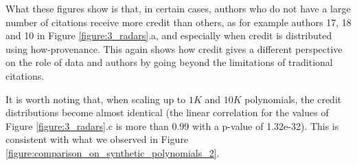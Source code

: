 \documentclass[preprint,12pt,sort&compress]{elsarticle}
\newcommand{\eat}[1]{}
\begin{document}
What these figures show is that, in certain cases, authors who do not have a large number of citations receive more credit than others, as for example authors 17, 18 and 10 in Figure \ref{figure:3_radars}.a, 
and especially when credit is distributed using how-provenance.
This again shows how credit gives a different perspective on the role of data and authors by going beyond the limitations of traditional citations.  

It is worth noting that, when scaling up to $1K$ and $10K$ polynomials, the credit distributions  become almost identical  
\eat{We note that, although not exactly overlapping, the values of credit assigned to the authors by those DS become quite similar with these higher quantities of polynomials, suggesting a sort of equivalence between the two DSs in this case, at least in the task of rewarding authors} (the linear correlation for the values of Figure \ref{figure:3_radars}.c is more than 0.99 with a p-value of 1.32e-32). This is consistent with what we observed in Figure \ref{figure:comparison_on_synthetic_polynomials_2}.
\end{document}
